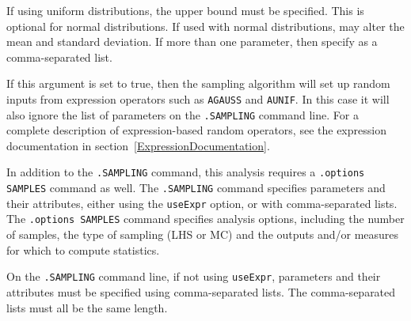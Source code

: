 \begin{Command}
\begin{Arguments}
If using uniform distributions, the upper bound must be specified.  This is optional for normal distributions.
  If used with normal distributions, may alter the mean and standard deviation.
  If more than one parameter, then specify as a comma-separated list.

If this argument is set to true, then the sampling algorithm will set up random 
  inputs from expression operators such as \verb|AGAUSS| and \verb|AUNIF|.  In 
  this case it will also ignore the list of parameters on the \verb|.SAMPLING| command line.
  For a complete description of expression-based random operators, see the expression
  documentation in section~\ref{ExpressionDocumentation}.

\end{Arguments}

\comments

In addition to the \verb|.SAMPLING| command, this analysis requires a 
  \verb|.options SAMPLES| command as well.  The \verb|.SAMPLING| command specifies 
  parameters and their attributes, either using the \verb|useExpr| option, or 
  with comma-separated lists.  The \verb|.options SAMPLES| command specifies 
  analysis options, including the number of samples, the type of sampling (LHS or MC)
  and the outputs and/or measures for which to compute statistics.

On the \verb|.SAMPLING| command line, if not using \verb|useExpr|, 
  parameters and their attributes must be specified 
  using comma-separated lists.  The comma-separated lists must all be the same length.

\end{Command}

